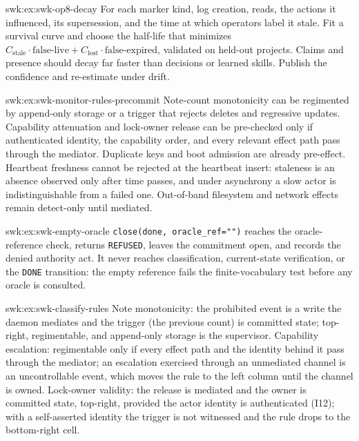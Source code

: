 \begin{pdSolution}{swk:ex:swk-op8-decay}
For each marker kind, log creation, reads, the actions it influenced, its supersession, and the time at which operators label it stale. Fit a survival curve and choose the half-life that minimizes $C_{\text{stale}}\cdot\text{false-live} + C_{\text{lost}}\cdot\text{false-expired}$, validated on held-out projects. Claims and presence should decay far faster than decisions or learned skills. Publish the confidence and re-estimate under drift.
\end{pdSolution}
\begin{pdSolution}{swk:ex:swk-monitor-rules-precommit}
Note-count monotonicity can be regimented by append-only storage or a trigger that rejects deletes and regressive updates. Capability attenuation and lock-owner release can be pre-checked only if authenticated identity, the capability order, and every relevant effect path pass through the mediator. Duplicate keys and boot admission are already pre-effect. Heartbeat freshness cannot be rejected at the heartbeat insert: staleness is an absence observed only after time passes, and under asynchrony a slow actor is indistinguishable from a failed one. Out-of-band filesystem and network effects remain detect-only until mediated.
\end{pdSolution}
\begin{pdSolution}{swk:ex:swk-empty-oracle}
\texttt{close(done, oracle\_ref="")} reaches the oracle-reference check, returns \texttt{REFUSED}, leaves the commitment open, and records the denied authority act. It never reaches classification, current-state verification, or the \texttt{DONE} transition: the empty reference fails the finite-vocabulary test before any oracle is consulted.
\end{pdSolution}
\begin{pdSolution}{swk:ex:swk-classify-rules}
Note monotonicity: the prohibited event is a write the daemon mediates and the trigger (the previous count) is committed state; top-right, regimentable, and append-only storage is the supervisor. Capability escalation: regimentable only if every effect path and the identity behind it pass through the mediator; an escalation exercised through an unmediated channel is an uncontrollable event, which moves the rule to the left column until the channel is owned. Lock-owner validity: the release is mediated and the owner is committed state, top-right, provided the actor identity is authenticated (I12); with a self-asserted identity the trigger is not witnessed and the rule drops to the bottom-right cell.
\end{pdSolution}
